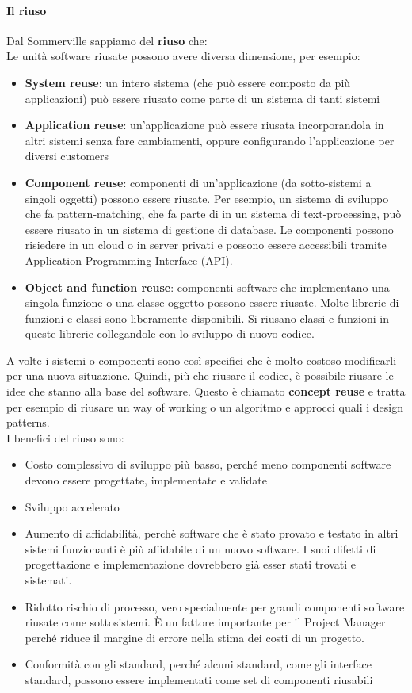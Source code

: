 			\paragraph{Il riuso}
			Dal Sommerville sappiamo del \textbf{riuso} che: \\
			Le unità software riusate possono avere diversa dimensione, per esempio:
			\begin{itemize}
				\item \textbf{System reuse}: un intero sistema (che può essere composto da più applicazioni) può essere riusato come parte di un sistema di tanti sistemi
				\item \textbf{Application reuse}: un'applicazione può essere riusata incorporandola in altri sistemi senza fare cambiamenti, oppure configurando l'applicazione per diversi customers
				\item \textbf{Component reuse}: componenti di un'applicazione (da sotto-sistemi a singoli oggetti) possono essere riusate. Per esempio, un sistema di sviluppo che fa pattern-matching, che fa parte di in un sistema di text-processing, può essere riusato in un sistema di gestione di database. Le componenti possono risiedere in un cloud o in server privati e possono essere accessibili tramite Application Programming Interface (API). 
				\item \textbf{Object and function reuse}: componenti software che implementano una singola funzione o una classe oggetto possono essere riusate. Molte librerie di funzioni e classi sono liberamente disponibili. Si riusano classi e funzioni in queste librerie collegandole con lo sviluppo di nuovo codice.
			\end{itemize}	
			A volte i sistemi o componenti sono così specifici che è molto costoso modificarli per una nuova situazione. Quindi, più che riusare il codice, è possibile riusare le idee che stanno alla base del software. Questo è chiamato \textbf{concept reuse} e tratta per esempio di riusare un way of working o un algoritmo e approcci quali i design patterns. \\
			I benefici del riuso sono:
			\begin{itemize}
				\item Costo complessivo di sviluppo più basso, perché meno componenti software devono essere progettate, implementate e validate
				\item Sviluppo accelerato
				\item Aumento di affidabilità, perchè software che è stato provato e testato in altri sistemi funzionanti è più affidabile di un nuovo software. I suoi difetti di progettazione e implementazione dovrebbero già esser stati trovati e sistemati.
				\item  Ridotto rischio di processo, vero specialmente per grandi componenti software riusate come sottosistemi. È un fattore importante per il Project Manager perché riduce il margine di errore nella stima dei costi di un progetto.
				\item Conformità con gli standard, perché alcuni standard, come gli interface standard, possono essere implementati come set di componenti riusabili
			\end{itemize}

